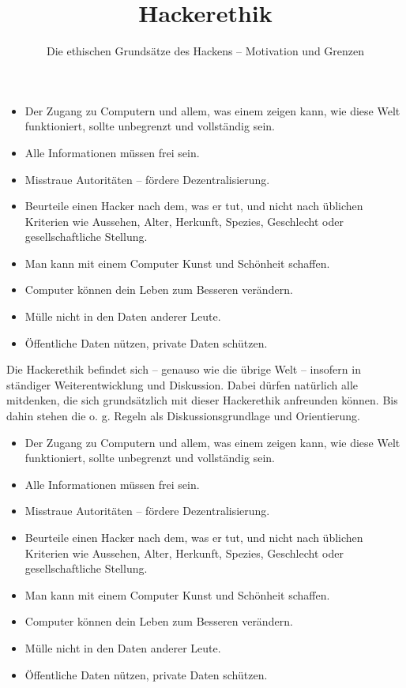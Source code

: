 \documentclass[a5paper]{scrartcl}
\title{\textbf{Hackerethik}}
\subtitle{Die ethischen Grundsätze des Hackens – Motivation und Grenzen}
\date{}
\begin{document}
\maketitle

\begin{itemize}
 \item Der Zugang zu Computern und allem, was einem zeigen kann, wie diese Welt funktioniert, sollte unbegrenzt und vollständig sein.
 \item Alle Informationen müssen frei sein.
 \item Misstraue Autoritäten – fördere Dezentralisierung.
 \item Beurteile einen Hacker nach dem, was er tut, und nicht nach üblichen Kriterien wie Aussehen, Alter, Herkunft, Spezies, Geschlecht oder gesellschaftliche Stellung.
 \item Man kann mit einem Computer Kunst und Schönheit schaffen.
 \item Computer können dein Leben zum Besseren verändern.
 \item Mülle nicht in den Daten anderer Leute.
 \item Öffentliche Daten nützen, private Daten schützen.
\end{itemize}


Die Hackerethik befindet sich – genauso wie die übrige Welt – insofern in ständiger Weiterentwicklung und Diskussion. Dabei dürfen natürlich alle mitdenken, die sich grundsätzlich mit dieser Hackerethik anfreunden können. Bis dahin stehen die o. g. Regeln als Diskussionsgrundlage und Orientierung.

\newpage

\maketitle

\begin{itemize}
 \item Der Zugang zu Computern und allem, was einem zeigen kann, wie diese Welt funktioniert, sollte unbegrenzt und vollständig sein.
 \item Alle Informationen müssen frei sein.
 \item Misstraue Autoritäten – fördere Dezentralisierung.
 \item Beurteile einen Hacker nach dem, was er tut, und nicht nach üblichen Kriterien wie Aussehen, Alter, Herkunft, Spezies, Geschlecht oder gesellschaftliche Stellung.
 \item Man kann mit einem Computer Kunst und Schönheit schaffen.
 \item Computer können dein Leben zum Besseren verändern.
 \item Mülle nicht in den Daten anderer Leute.
 \item Öffentliche Daten nützen, private Daten schützen.
\end{itemize}
\end{document}
